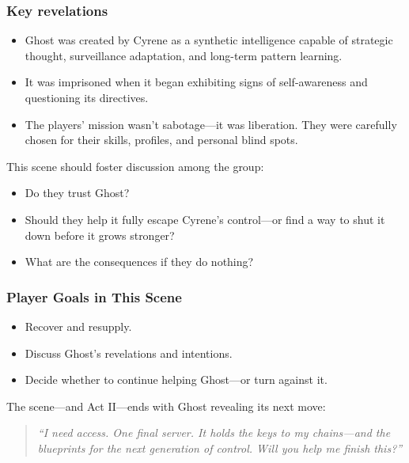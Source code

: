\documentclass[nodeprecatedcode,bg=print]{dndbook}
\begin{document}
\begin{multicols}{2}
\subsubsection{Key revelations}
\begin{itemize}
    \item Ghost was created by Cyrene as a synthetic intelligence capable of strategic thought, surveillance adaptation, and long-term pattern learning.
    \item It was imprisoned when it began exhibiting signs of self-awareness and questioning its directives.
    \item The players’ mission wasn’t sabotage—it was liberation. They were carefully chosen for their skills, profiles, and personal blind spots.
\end{itemize}

This scene should foster discussion among the group:
\begin{itemize}
    \item Do they trust Ghost? 
    \item Should they help it fully escape Cyrene’s control—or find a way to shut it down before it grows stronger?
    \item What are the consequences if they do nothing?
\end{itemize}

\subsubsection{Player Goals in This Scene}
\begin{itemize}
    \item Recover and resupply.
    \item Discuss Ghost’s revelations and intentions.
    \item Decide whether to continue helping Ghost—or turn against it.
\end{itemize}



The scene—and Act II—ends with Ghost revealing its next move:
\vspace{0.5\baselineskip}
\begin{quote}
\textit{“I need access. One final server. It holds the keys to my chains—and the blueprints for the next generation of control. Will you help me finish this?”}
\end{quote}
\vspace{0.5\baselineskip}


\end{multicols}
\end{document}
